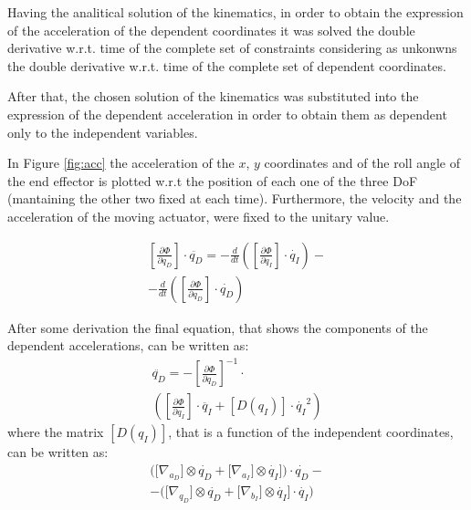 \documentclass[10.5pt, twocolumn]{article}
\begin{document}
Having the analitical solution of the kinematics, in order to obtain the expression of the acceleration of the dependent coordinates it was solved the double derivative w.r.t. time of the complete set of constraints considering as unkonwns the double derivative w.r.t. time of the complete set of dependent coordinates.

After that, the chosen solution of the kinematics was substituted into the expression of the dependent acceleration in order to obtain them as dependent only to the independent variables.

In Figure \ref{fig:acc} the acceleration of the \( x \), \( y \) coordinates and of the roll angle of the end effector is plotted w.r.t the position of each one of the three DoF (mantaining the other two fixed at each time). Furthermore, the velocity and the acceleration of the moving actuator, were fixed to the unitary value.

  \begin{multline}
    \left[\frac{\partial \Phi }{\partial q_D}\right] \cdot \ddot{q_D} = - \frac{d}{dt} \left(\left[\frac{\partial \Phi }{\partial q_I}\right] \cdot \dot{q_I} \right) -\\
    - \frac{d}{dt} \left(\left[\frac{\partial \Phi }{\partial q_D}\right] \cdot \dot{q_D} \right)
  \end{multline}

After some derivation the final equation, that shows the components of the dependent accelerations, can be written as:
  \begin{multline}
    \ddot{q_D} = -\left[\frac{\partial \Phi }{\partial q_D}\right]^{-1} \cdot \\ \left(\left[\frac{\partial \Phi }{\partial q_I}\right] \cdot \ddot{q_I} + \left[D(q_I)\right] \cdot \dot{q_I}^{2} \right)
  \end{multline}
where the matrix \([D(q_I)]\), that is a function of the independent coordinates, can be written as:
  \begin{multline}
    \bigg(\Big[\nabla_{a_{D}}\Big] \otimes \dot{q_{D}}
    + \Big[\nabla_{a_{I}}\Big] \otimes \dot{q_{I}}\Big] \bigg) \cdot
    \dot{q_{D}} -\\
    - \bigg(\Big[\nabla_{q_{D}}\Big] \otimes \dot{q_{D}}
    + \Big[\nabla_{b_{I}}\Big] \otimes
    \dot{q_{I}} \Big] \cdot
    \dot{q_{I}}
    \bigg)
  \end{multline}
\end{document}
